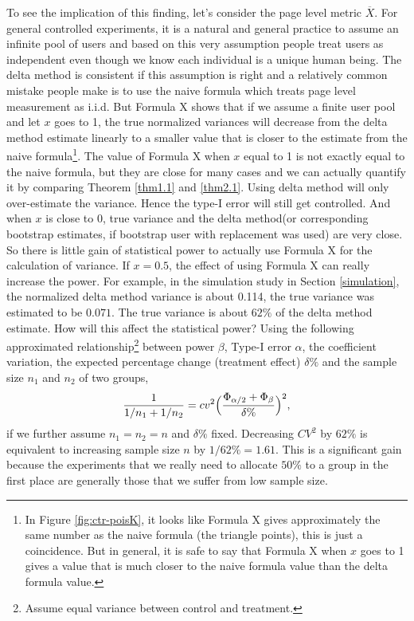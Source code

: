 \documentclass[10pt]{article}
\newcommand{\xbar}{\overline{X}}
\begin{document}
To see the implication of this finding, let's consider the page level metric $\xbar$.  For general controlled experiments, it is a natural and general practice to assume an infinite pool of users and based on this very assumption people treat users as independent even though we know each individual is a unique human being. The delta method is consistent if this assumption is right and a relatively common mistake people make is to use the naive formula which treats page level measurement as i.i.d.  But Formula X shows that if we assume a finite user pool and let $x$ goes to 1, the true normalized variances will decrease from the delta method estimate linearly to a smaller value that is closer to the estimate from the naive formula\footnote{In Figure \ref{fig:ctr-poisK}, it looks like Formula X gives approximately the same number as the naive formula (the triangle points), this is just a coincidence. But in general, it is safe to say that Formula X when $x$ goes to 1 gives a value that is much closer to the naive formula value than the delta formula value.}. The value of Formula X when $x$ equal to 1 is not exactly equal to the naive formula, but they are close for many cases and we can actually quantify it by comparing Theorem \ref{thm1.1} and \ref{thm2.1}.
Using delta method will only over-estimate the variance. Hence the type-I error will still get controlled. And when $x$ is close to 0, true variance and the delta method(or corresponding bootstrap estimates, if bootstrap user with replacement was used) are very close. So there is little gain of statistical power to actually use Formula X for the calculation of variance.
If $x=0.5$, the effect of using Formula X can really increase the power. For example, in the simulation study in Section \ref{simulation}, the normalized delta method variance is about 0.114, the true variance was estimated to be $0.071$. The true variance is about $62\%$ of the delta method estimate. How will this affect the statistical power?
Using the following  approximated relationship\footnote{Assume equal variance between control and treatment.} between power $\beta$, Type-I error $\alpha$, the coefficient variation, the expected percentage change (treatment effect) $\delta\%$ and the sample size $n_1$ and $n_2$ of two groups,
\begin{align}\label{power}
\frac{1}{1/n_1+1/n_2}= cv^2\Bigl(\frac{\Phi_{\alpha/2}+\Phi_\beta}{\delta\%}\Bigr)^2,
\end{align}  
if we further assume $n_1=n_2=n$ and $\delta\%$ fixed. Decreasing $CV^2$ by $62\%$ is equivalent to increasing sample size $n$ by $1/62\% = 1.61$. This is a significant gain because the experiments that we really need to allocate $50\%$ to a group in the first place are generally those that we suffer from low sample size. 
\end{document}
